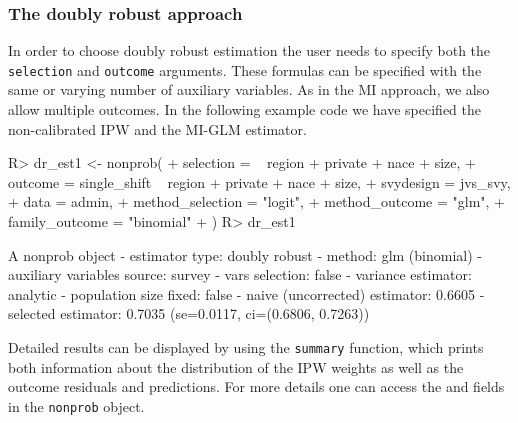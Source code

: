 \documentclass[
]{jss}
\begin{document}
\subsubsection{The doubly robust
approach}\label{the-doubly-robust-approach}

In order to choose doubly robust estimation the user needs to specify
both the \texttt{selection} and \texttt{outcome} arguments. These
formulas can be specified with the same or varying number of auxiliary
variables. As in the MI approach, we also allow multiple outcomes. In
the following example code we have specified the non-calibrated IPW and
the MI-GLM estimator.

\begin{CodeChunk}
\begin{CodeInput}
R> dr_est1 <- nonprob(
+   selection = ~ region + private + nace + size,
+   outcome = single_shift ~ region + private + nace + size,
+   svydesign = jvs_svy,
+   data = admin,
+   method_selection = "logit",
+   method_outcome = "glm",
+   family_outcome = "binomial"
+ )
R> dr_est1
\end{CodeInput}
\begin{CodeOutput}
A nonprob object
 - estimator type: doubly robust
 - method: glm (binomial)
 - auxiliary variables source: survey
 - vars selection: false
 - variance estimator: analytic
 - population size fixed: false
 - naive (uncorrected) estimator: 0.6605
 - selected estimator: 0.7035 (se=0.0117, ci=(0.6806, 0.7263))
\end{CodeOutput}
\end{CodeChunk}

Detailed results can be displayed by using the \texttt{summary}
function, which prints both information about the distribution of the
IPW weights as well as the outcome residuals and predictions. For more
details one can access the  and 
fields in the \texttt{nonprob} object.
\end{document}
